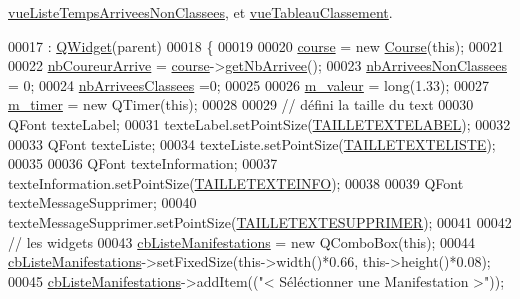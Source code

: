 \hyperlink{class_i_h_m_chrono_cross_aaf04338d882f708e57d9872b1c82b7a0}{vue\+Liste\+Temps\+Arrivees\+Non\+Classees}, et \hyperlink{class_i_h_m_chrono_cross_a199204276756844adbd6ca3c9030ad2f}{vue\+Tableau\+Classement}.


\begin{DoxyCode}
00017                                               : \hyperlink{class_q_widget}{QWidget}(parent)
00018 \{
00019 
00020     \hyperlink{class_i_h_m_chrono_cross_a03a8226c0e7f423d29302d9a06284ab4}{course} = \textcolor{keyword}{new} \hyperlink{class_course}{Course}(\textcolor{keyword}{this});
00021 
00022     \hyperlink{class_i_h_m_chrono_cross_aba349505e99e6e320b218ba2b7fb485e}{nbCoureurArrive} = \hyperlink{class_i_h_m_chrono_cross_a03a8226c0e7f423d29302d9a06284ab4}{course}->\hyperlink{class_course_ad8dd87e7f299bc938f40423f28c837e8}{getNbArrivee}();
00023     \hyperlink{class_i_h_m_chrono_cross_aa3198d36b0574b477a328621c8e1e0f0}{nbArriveesNonClassees} = 0;
00024     \hyperlink{class_i_h_m_chrono_cross_a9bdcd0e57b79f64957eefea0f9d2b097}{nbArriveesClassees} =0;
00025 
00026     \hyperlink{class_i_h_m_chrono_cross_a4bb2449f0b2cc9891c09fa3e32f56229}{m\_valeur} = long(1.33);
00027     \hyperlink{class_i_h_m_chrono_cross_ad29ebde513a6e722cf87aa06e767416a}{m\_timer} = \textcolor{keyword}{new} QTimer(\textcolor{keyword}{this});
00028 
00029     \textcolor{comment}{// défini la taille du text}
00030     QFont texteLabel;
00031     texteLabel.setPointSize(\hyperlink{ihmchronocross_8h_a407f067284fd7ac16426ac29cbfcd356}{TAILLETEXTELABEL});
00032 
00033     QFont texteListe;
00034     texteListe.setPointSize(\hyperlink{ihmchronocross_8h_a4169235bca6fe9370d9b368912e62af0}{TAILLETEXTELISTE});
00035 
00036     QFont texteInformation;
00037     texteInformation.setPointSize(\hyperlink{ihmchronocross_8h_a93033547a126f30c05119d40b51384da}{TAILLETEXTEINFO});
00038 
00039     QFont texteMessageSupprimer;
00040     texteMessageSupprimer.setPointSize(\hyperlink{ihmchronocross_8h_a79ebe381f5864a987975ff0072b37ae7}{TAILLETEXTESUPPRIMER});
00041 
00042     \textcolor{comment}{// les widgets}
00043     \hyperlink{class_i_h_m_chrono_cross_a4b7a6af527d8d2d28d8ea6ea7cbfac75}{cbListeManifestations} = \textcolor{keyword}{new} QComboBox(\textcolor{keyword}{this});
00044     \hyperlink{class_i_h_m_chrono_cross_a4b7a6af527d8d2d28d8ea6ea7cbfac75}{cbListeManifestations}->setFixedSize(this->width()*0.66, this->height()*0.08);
00045     \hyperlink{class_i_h_m_chrono_cross_a4b7a6af527d8d2d28d8ea6ea7cbfac75}{cbListeManifestations}->addItem((\textcolor{stringliteral}{"< Séléctionner une Manifestation >"}));

\end{DoxyCode}
